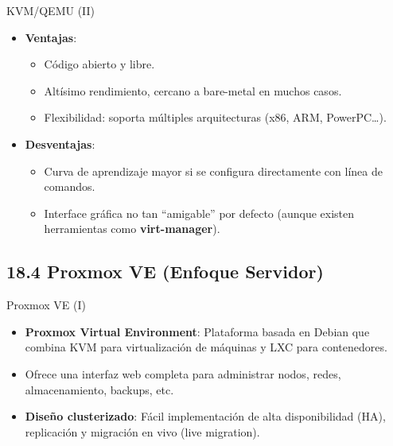 \documentclass{beamer}
\begin{document}
\begin{frame}{KVM/QEMU (II)}
    \begin{itemize}
        \item \textbf{Ventajas}:
            \begin{itemize}
                \item Código abierto y libre.
                \item Altísimo rendimiento, cercano a bare-metal en muchos casos.
                \item Flexibilidad: soporta múltiples arquitecturas (x86, ARM, PowerPC…).
            \end{itemize}
        \item \textbf{Desventajas}:
            \begin{itemize}
                \item Curva de aprendizaje mayor si se configura directamente con línea de comandos.
                \item Interface gráfica no tan “amigable” por defecto (aunque existen herramientas como \textbf{virt-manager}).
            \end{itemize}
    \end{itemize}
\end{frame}

\subsection{18.4 Proxmox VE (Enfoque Servidor)}
\begin{frame}{Proxmox VE (I)}
    \begin{itemize}
        \item \textbf{Proxmox Virtual Environment}: Plataforma basada en Debian que combina KVM para virtualización de máquinas y LXC para contenedores.
        \item Ofrece una interfaz web completa para administrar nodos, redes, almacenamiento, backups, etc.
        \item \textbf{Diseño clusterizado}: Fácil implementación de alta disponibilidad (HA), replicación y migración en vivo (live migration).
    \end{itemize}
\end{frame}
\end{document}
